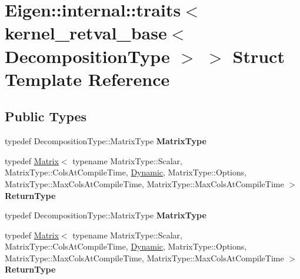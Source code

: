 \hypertarget{struct_eigen_1_1internal_1_1traits_3_01kernel__retval__base_3_01_decomposition_type_01_4_01_4}{}\section{Eigen\+:\+:internal\+:\+:traits$<$ kernel\+\_\+retval\+\_\+base$<$ Decomposition\+Type $>$ $>$ Struct Template Reference}
\label{struct_eigen_1_1internal_1_1traits_3_01kernel__retval__base_3_01_decomposition_type_01_4_01_4}
\subsection*{Public Types}
\begin{DoxyCompactItemize}
\item 
\mbox{\label{struct_eigen_1_1internal_1_1traits_3_01kernel__retval__base_3_01_decomposition_type_01_4_01_4_a42f7adb6bf62e05402f6f461eb075fa2}} 
typedef Decomposition\+Type\+::\+Matrix\+Type {\bfseries Matrix\+Type}
\item 
\mbox{\label{struct_eigen_1_1internal_1_1traits_3_01kernel__retval__base_3_01_decomposition_type_01_4_01_4_a3319541f306277cd67ea29a75c165cb5}} 
typedef \hyperlink{group___core___module_class_eigen_1_1_matrix}{Matrix}$<$ typename Matrix\+Type\+::\+Scalar, Matrix\+Type\+::\+Cols\+At\+Compile\+Time, \hyperlink{namespace_eigen_ad81fa7195215a0ce30017dfac309f0b2}{Dynamic}, Matrix\+Type\+::\+Options, Matrix\+Type\+::\+Max\+Cols\+At\+Compile\+Time, Matrix\+Type\+::\+Max\+Cols\+At\+Compile\+Time $>$ {\bfseries Return\+Type}
\item 
\mbox{\label{struct_eigen_1_1internal_1_1traits_3_01kernel__retval__base_3_01_decomposition_type_01_4_01_4_a42f7adb6bf62e05402f6f461eb075fa2}} 
typedef Decomposition\+Type\+::\+Matrix\+Type {\bfseries Matrix\+Type}
\item 
\mbox{\label{struct_eigen_1_1internal_1_1traits_3_01kernel__retval__base_3_01_decomposition_type_01_4_01_4_a3319541f306277cd67ea29a75c165cb5}} 
typedef \hyperlink{group___core___module_class_eigen_1_1_matrix}{Matrix}$<$ typename Matrix\+Type\+::\+Scalar, Matrix\+Type\+::\+Cols\+At\+Compile\+Time, \hyperlink{namespace_eigen_ad81fa7195215a0ce30017dfac309f0b2}{Dynamic}, Matrix\+Type\+::\+Options, Matrix\+Type\+::\+Max\+Cols\+At\+Compile\+Time, Matrix\+Type\+::\+Max\+Cols\+At\+Compile\+Time $>$ {\bfseries Return\+Type}
\end{DoxyCompactItemize}


